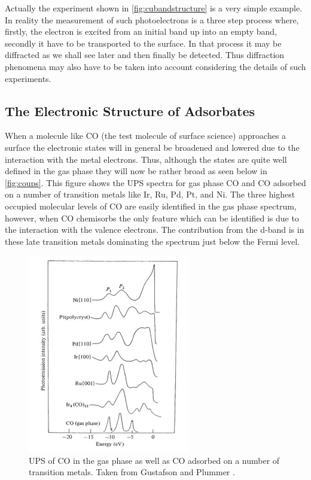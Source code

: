 Actually the experiment shown in \autoref{fig:cubandstructure} is a very simple example. In reality the measurement of such photoelectrons is a three step process  \cite{Berglund} where, firstly, the electron is excited from an initial band up into an empty band, secondly it have to be transported to the surface. In that process it may be diffracted as we shall see later and then  finally be detected. Thus diffraction phenomena may also have to be taken into account considering the details of such experiments.

\subsection{The Electronic Structure of Adsorbates}
When a molecule like CO (the test molecule of surface science) approaches a surface the electronic states will in general be broadened and lowered due to the interaction with the metal electrons. Thus, although the states are quite well defined in the gas phase they will now be rather broad as seen below in \autoref{fig:coups}. This figure shows the UPS spectra for gas phase CO and CO adsorbed on a number of transition metals like Ir, Ru, Pd, Pt, and Ni. The three highest occupied molecular levels of CO are easily identified in the gas phase spectrum, however, when CO chemisorbs the only feature which can be identified is due to the interaction with the valence electrons.  The contribution from the d-band is  in these late transition metals dominating the spectrum just below the Fermi level.

\begin{figure}[h!]
	\begin{center}
	\includegraphics[scale=4]{figures/05_06.png}
	\caption{UPS of CO in the gas phase as well as CO adsorbed on a number of transition metals. Taken from Gustafson and Plummer \cite{Gustafson}.}
	\label{fig:coups}
	\end{center}
\end{figure}

